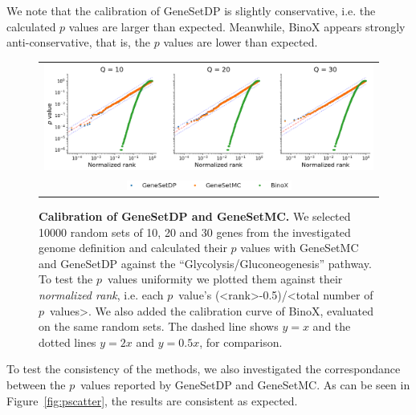 \documentclass[10pt,letterpaper]{article}
\begin{document}
We note that the calibration of GeneSetDP is slightly conservative, i.e. the calculated $p$ values are larger than expected. Meanwhile, BinoX appears strongly anti-conservative, that is, the $p$ values are lower than expected.

\begin{figure}[htb]
  \begin{center}
		  \begin{tabular}[t]{c}
				\includegraphics[width=1.0\textwidth]{figures/calibration_multiple.png} \\
				\includegraphics[width=0.5\textwidth]{figures/calibration_legend.png}
		\end{tabular}
  \end{center}
  \caption{{\bf Calibration of GeneSetDP and GeneSetMC.} We selected 10000 random sets of 10, 20 and 30 genes from the investigated genome definition and calculated their $p$ values with GeneSetMC and GeneSetDP against the ``Glycolysis/Gluconeogenesis'' pathway. To test the $p$~values uniformity we plotted them against their {\em normalized rank}, i.e. each $p$~value's (<rank>-0.5)/<total number of $p$~values>. We also added the calibration curve of BinoX, evaluated on the same random sets. The dashed line shows $y = x$ and the dotted lines $y = 2x$ and $y = 0.5x$, for comparison.}
  \label{fig:calibration}
\end{figure}

To test the consistency of the methods, we also investigated the correspondance between the $p$~values reported by GeneSetDP and GeneSetMC. As can be seen in Figure~\ref{fig:pscatter}, the results are consistent as expected.
\end{document}
